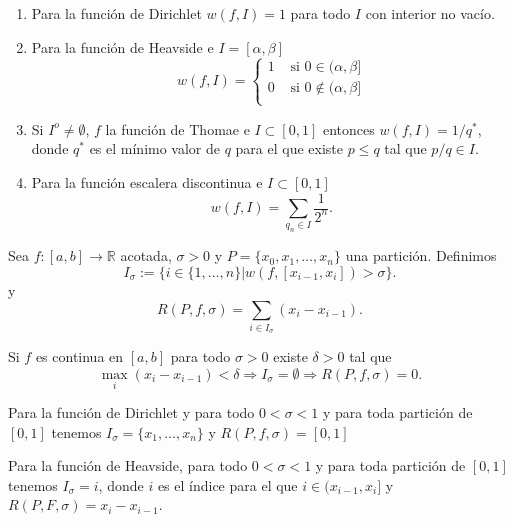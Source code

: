 \begin{ejemplo} 
\begin{enumerate}
 \item Para la función de Dirichlet $w(f,I)=1$ para todo $I$ con interior no vacío.
 \item Para la función de Heavside e $I=[\alpha,\beta]$
 \[
  w(f,I)=\begin{cases}
          1 & \text{ si } 0\in (\alpha,\beta]\\
          0 & \text{ si } 0\notin (\alpha,\beta]\\
         \end{cases}
 \]
  \item Si $I^o\neq\emptyset$, $f$ la función de Thomae e $I\subset [0,1]$ entonces 
     $ w(f,I)=1/q^*$, donde $q^*$ es el mínimo valor de $q$ para el que existe $p\leq q$ tal que $p/q\in I$.
  \item Para la función escalera discontinua e $I\subset [0,1]$
  \[
   w(f,I)=\sum_{q_n\in I}\frac{1}{2^n}.
  \]
\end{enumerate}

 
\end{ejemplo}



\begin{definicion} Sea $f:[a,b]\to\mathbb{R}$ acotada, $\sigma>0$ y $P=\{x_0,x_1,\ldots,x_n\}$ una partición. Definimos
\[
 I_{\sigma}:=\{i\in\{1,\ldots,n\}|w(f,[x_{i-1},x_i])>\sigma\}.
\]
y
\[
 R(P,f,\sigma)=\sum_{i\in I_{\sigma}}(x_i-x_{i-1}).
\]
\end{definicion}





\begin{proposicion} Si $f$ es continua en $[a,b]$ para todo $\sigma>0$ existe $\delta>0$ tal que 
\[
\max_i(x_i-x_{i-1})<\delta\Rightarrow I_{\sigma}=\emptyset\Rightarrow R(P,f,\sigma)=0. 
\]

 
\end{proposicion}

\begin{ejemplo} Para la función de Dirichlet y para todo $0<\sigma<1$ y para toda partición de $[0,1]$ tenemos $I_{\sigma}=\{x_1,\ldots,x_n\}$ y $R(P,f,\sigma)=[0,1]$
 
\end{ejemplo}

\begin{ejemplo} Para la función de Heavside,   para todo $0<\sigma<1$ y para toda partición de $[0,1]$ tenemos $I_{\sigma}=i$, donde $i$ es el índice para el que $i\in (x_{i-1},x_i]$ y $R(P,F,\sigma)=x_i-x_{i-1}$.
 
\end{ejemplo}

